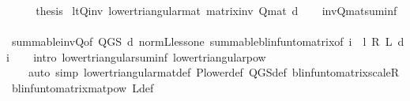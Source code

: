 \begin{isabellebody}
\ \ \isamarkupfalse%
\ \isamarkupfalse%
\ {\isacharquery}{\kern0pt}thesis\isacommand{{\isachardot}{\kern0pt}}\isamarkupfalse%
\isanewline
{}\isamarkupfalse%
%
\endisatagproof
{\isafoldproof}%
%
\isadelimproof
\isanewline
%
\endisadelimproof
\isanewline
{}\isamarkupfalse%
\ lt{\isacharunderscore}{\kern0pt}Q{\isacharunderscore}{\kern0pt}inv{\isacharcolon}{\kern0pt}\ {\isachardoublequoteopen}lower{\isacharunderscore}{\kern0pt}triangular{\isacharunderscore}{\kern0pt}mat\ {\isacharparenleft}{\kern0pt}matrix{\isacharunderscore}{\kern0pt}inv\ {\isacharparenleft}{\kern0pt}Q{\isacharunderscore}{\kern0pt}mat\ d{\isacharparenright}{\kern0pt}{\isacharparenright}{\kern0pt}{\isachardoublequoteclose}\isanewline
%
\isadelimproof
\ \ %
\endisadelimproof
%
\isatagproof
{}\isamarkupfalse%
\ inv{\isacharunderscore}{\kern0pt}Q{\isacharunderscore}{\kern0pt}mat{\isacharunderscore}{\kern0pt}suminf\isanewline
\ \ \isamarkupfalse%
\ summable{\isacharunderscore}{\kern0pt}inv{\isacharunderscore}{\kern0pt}Q{\isacharbrackleft}{\kern0pt}of\ {\isachardoublequoteopen}Q{\isacharunderscore}{\kern0pt}GS\ d{\isachardoublequoteclose}{\isacharbrackright}{\kern0pt}\ norm{\isacharunderscore}{\kern0pt}{\isasymP}\isactrlsub L{\isacharunderscore}{\kern0pt}less{\isacharunderscore}{\kern0pt}one\ summable{\isacharunderscore}{\kern0pt}blinfun{\isacharunderscore}{\kern0pt}to{\isacharunderscore}{\kern0pt}matrix{\isacharbrackleft}{\kern0pt}of\ {\isachardoublequoteopen}{\isasymlambda}i{\isachardot}{\kern0pt}\ \ {\isacharparenleft}{\kern0pt}l\ {\isacharasterisk}{\kern0pt}\isactrlsub R\ {\isasymP}\isactrlsub L\ d{\isacharparenright}{\kern0pt}{\isacharcircum}{\kern0pt}{\isacharcircum}{\kern0pt}i{\isachardoublequoteclose}{\isacharbrackright}{\kern0pt}\isanewline
\ \ \isamarkupfalse%
\ {\isacharparenleft}{\kern0pt}intro\ lower{\isacharunderscore}{\kern0pt}triangular{\isacharunderscore}{\kern0pt}suminf\ lower{\isacharunderscore}{\kern0pt}triangular{\isacharunderscore}{\kern0pt}pow{\isacharparenright}{\kern0pt}\ \isanewline
\ \ \ \ {\isacharparenleft}{\kern0pt}auto\ simp{\isacharcolon}{\kern0pt}\ lower{\isacharunderscore}{\kern0pt}triangular{\isacharunderscore}{\kern0pt}mat{\isacharunderscore}{\kern0pt}def\ P{\isacharunderscore}{\kern0pt}lower{\isacharunderscore}{\kern0pt}def\ Q{\isacharunderscore}{\kern0pt}GS{\isacharunderscore}{\kern0pt}def\ blinfun{\isacharunderscore}{\kern0pt}to{\isacharunderscore}{\kern0pt}matrix{\isacharunderscore}{\kern0pt}scaleR\ blinfun{\isacharunderscore}{\kern0pt}to{\isacharunderscore}{\kern0pt}matrix{\isacharunderscore}{\kern0pt}matpow\ {\isasymP}\isactrlsub L{\isacharunderscore}{\kern0pt}def{\isacharparenright}{\kern0pt}%

\end{isabellebody}
